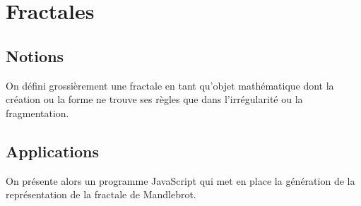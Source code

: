 %
%

\section{Fractales}
\subsection{Notions}
On défini grossièrement une fractale en tant qu'objet mathématique
dont la création ou la forme ne trouve
ses règles que dans l'irrégularité ou la fragmentation.%
\subsection{Applications}
On présente alors un programme JavaScript qui met en place la génération de
la représentation de la fractale de Mandlebrot.
\\
